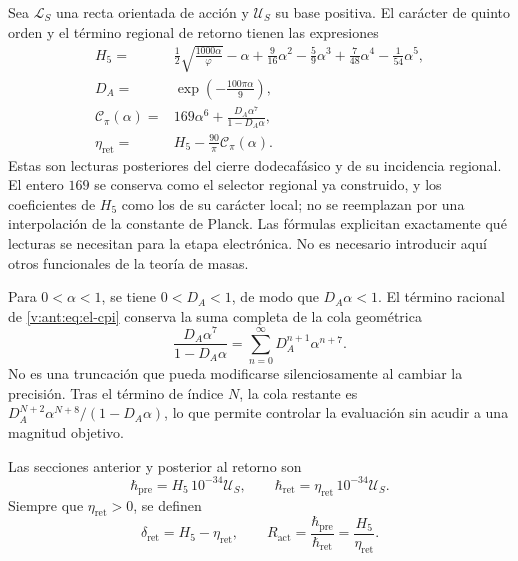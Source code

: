 Sea \(\mathcal L_S\) una recta orientada de acción y \(\mathcal U_S\)
su base positiva. El carácter de quinto orden y el término regional de
retorno tienen las expresiones
\begin{align}
 H_5={}&\frac12\sqrt{\frac{1000\alpha}{\varphi}}-\alpha
   +\frac9{16}\alpha^2-\frac59\alpha^3
   +\frac7{48}\alpha^4-\frac1{54}\alpha^5,
   \label{v:ant:eq:el-h5}\\
 D_A={}&\exp\!\left(-\frac{100\pi\alpha}{9}\right),
   \label{v:ant:eq:el-da}\\
 \mathcal C_\pi(\alpha)={}&169\alpha^6+
       \frac{D_A\alpha^7}{1-D_A\alpha},
   \label{v:ant:eq:el-cpi}\\
 \eta_{\mathrm{ret}}={}&H_5-\frac{90}{\pi}\mathcal C_\pi(\alpha).
   \label{v:ant:eq:el-eta}
\end{align}
Estas son lecturas posteriores del cierre dodecafásico y de su
incidencia regional. El entero \(169\) se conserva como el selector
regional ya construido, y los coeficientes de \(H_5\) como los de su
carácter local; no se reemplazan por una interpolación de la constante de
Planck. Las fórmulas explicitan exactamente qué lecturas se necesitan
para la etapa electrónica. No es necesario introducir aquí otros
funcionales de la teoría de masas.

Para \(0<\alpha<1\), se tiene \(0<D_A<1\), de modo que
\(D_A\alpha<1\). El término racional de \eqref{v:ant:eq:el-cpi} conserva la
suma completa de la cola geométrica
\begin{equation}
 \frac{D_A\alpha^7}{1-D_A\alpha}
 =\sum_{n=0}^{\infty}D_A^{n+1}\alpha^{n+7}.
 \label{v:ant:eq:el-cola-regional}
\end{equation}
No es una truncación que pueda modificarse silenciosamente al cambiar la
precisión. Tras el término de índice \(N\), la cola restante es
\(D_A^{N+2}\alpha^{N+8}/(1-D_A\alpha)\), lo que permite controlar la
evaluación sin acudir a una magnitud objetivo.

\begin{definition}
Las secciones anterior y posterior al retorno son
\begin{equation}
 \hbar_{\mathrm{pre}}=H_5\,10^{-34}\mathcal U_S,
 \qquad
 \hbar_{\mathrm{ret}}=\eta_{\mathrm{ret}}\,10^{-34}\mathcal U_S.
 \label{v:ant:eq:el-secciones-accion}
\end{equation}
Siempre que \(\eta_{\mathrm{ret}}>0\), se definen
\begin{equation}
 \delta_{\mathrm{ret}}=H_5-\eta_{\mathrm{ret}},\qquad
 R_{\mathrm{act}}=\frac{\hbar_{\mathrm{pre}}}{\hbar_{\mathrm{ret}}}
 =\frac{H_5}{\eta_{\mathrm{ret}}}.
 \label{v:ant:eq:el-ratio}
\end{equation}
\end{definition}


